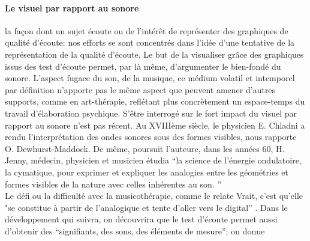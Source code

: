 \paragraph{Le visuel par rapport au sonore}  
	la façon dont un sujet écoute ou de l'intérêt de représenter des graphiques de
qualité d'écoute: 
nos efforts se sont concentrés dans l'idée d'une tentative de la représentation de la  qualité d'écoute. Le 
but de la visualiser %
grâce  des 
graphiques issus des test d'écoute  permet, par là même, d'argumenter le bien-fondé du sonore. %
L'aspect fugace du son, de la musique, ce médium volatil et
intemporel par
définition n'apporte pas le
même aspect que peuvent amener d'autres supports, comme en art-thérapie, 
reflétant plus concrètement un espace-temps du travail d'élaboration
psychique.
S'être interrogé sur le fort impact du visuel par rapport au sonore n'est pas récent. Au XVIIIème siècle, le 
physicien E. Chladni a rendu l'interprétation des ondes sonores sous des formes visibles, nous 
rapporte O. Dewhurst-Maddock. De même, poursuit l'auteure, dans les années 60, H. Jenny, 
médecin, physicien et musicien étudia  ``la science de l'énergie ondulatoire, la cymatique, pour exprimer 
et expliquer les analogies entre les géométries et formes visibles de la nature avec celles inhérentes au 
son. ''\autocite [30] {Dewhurst}
\\
 Le défi ou la difficulté avec la musicothérapie, comme le relate Vrait, 
 c'est qu'elle  "se constitue à partir 
 de l'analogique et tente d'aller vers le digital'' 
 \autocite[24]{vrait_musicotherapie_2018}.
Dans le développement qui suivra, on découvrira que le test d'écoute permet aussi d'obtenir des   
\enquote{signifiants, des sons, des éléments de mesure}; on donne
